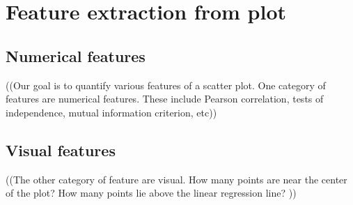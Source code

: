 \section{Feature extraction from plot}
\label{sec:visualizer:features}

\subsection{Numerical features}

((Our goal is to quantify various features of a scatter plot. One category of features are numerical features. These include Pearson correlation, tests of independence, mutual information criterion, etc))

\subsection{Visual features}

((The other category of feature are visual. How many points are near the center of the plot? How many points lie above the linear regression line? ))

